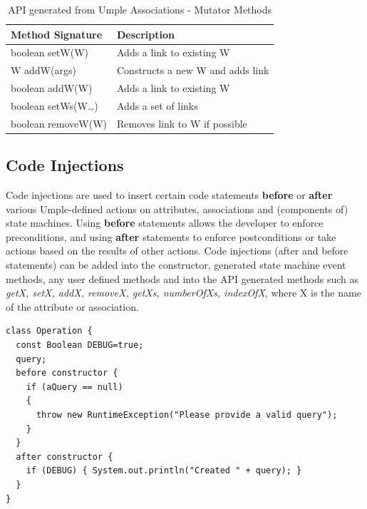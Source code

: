 \begin{table}[h]
\caption{API generated from Umple Associations - Mutator Methods \cite{UmpleAPI}}
\label{table:apiAssocs2}
\begin{tabularx}{\textwidth}{Y|Y}
\toprule
{}
\textbf{Method Signature} & \textbf{Description}     \\ \hline
boolean setW(W)   & Adds a link to existing W   		\\ 
W addW(args)    & Constructs a new W and adds link      \\ 
boolean addW(W)  & Adds a link to existing W            \\ 
boolean setWs(W…)    & Adds a set of links              \\ 
 boolean removeW(W) &   Removes link to W if possible    \\
\end{tabularx}
\end{table}


\subsection{Code Injections}
Code injections are used to insert certain code statements \textbf{before} or \textbf{after} various Umple-defined actions on attributes, associations and (components of) state machines. Using \textbf{before} statements allows the developer to enforce preconditions, and using \textbf{after} statements to enforce postconditions or take actions based on the results of other actions. Code injections (after and before statements) can be added into the constructor, generated state machine event methods, any user defined methods and into the API generated methods such as \textit{getX, setX, addX, removeX, getXs, numberOfXs, indexOfX}, where X is the name of the attribute or association.

\begin{lstlisting}[style=umpleOut,label={lst:codeInjection},caption=A code injection into the constructor]
class Operation {  
  const Boolean DEBUG=true;  
  query;  
  before constructor {  
    if (aQuery == null)  
    {  
      throw new RuntimeException("Please provide a valid query");  
    }  
  }  
  after constructor {  
    if (DEBUG) { System.out.println("Created " + query); }  
  }  
}  
\end{lstlisting}

